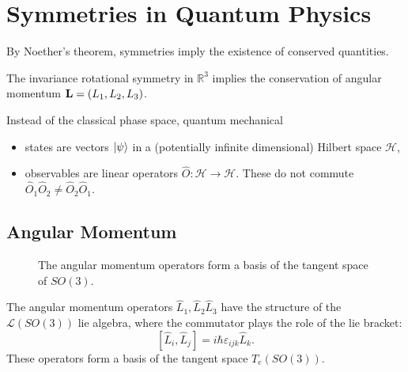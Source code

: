 \section{Symmetries in Quantum Physics}%
\label{sec:quantum_phyiscs}

By Noether's theorem, symmetries imply the existence of conserved quantities.

\begin{example}
  The invariance rotational symmetry in $\mathbb{R}^3$ implies the conservation of angular momentum $\vb L = (L_1, L_2, L_3)$.
\end{example}

Instead of the classical phase space, quantum mechanical
\begin{itemize}
  \item states are vectors $\ket{\psi}$ in a (potentially infinite dimensional) Hilbert space $\mathcal{H}$,
  \item observables are linear operators $\hat O \colon \mathcal{H} \rightarrow \mathcal{H}$. These do not commute $\hat O_1 \hat O_2 \neq \hat O_2 \hat O_1$.
\end{itemize}

\subsection{Angular Momentum}%
\label{sub:angular_momentum}

\begin{wrapfigure}{R}{0.31\columnwidth}
  \centering
  \def\svgwidth{0.25\columnwidth}
  
  \caption{The angular momentum operators form a basis of the tangent space of $SO(3)$.}
  \label{fig:so3}
\end{wrapfigure}

The angular momentum operators $\hat L_1, \hat L_2 \hat L_3$ have the structure of the $\mathscr{L}(SO(3))$ lie algebra, where the commutator plays the role of the lie bracket:
\begin{equation}
  \label{eq:ang-mom-com}
  [\hat L_i, \hat L_j] = i \hbar \varepsilon_{ijk} \hat L_k.
\end{equation}
These operators form a basis of the tangent space $T_e (SO(3))$.

